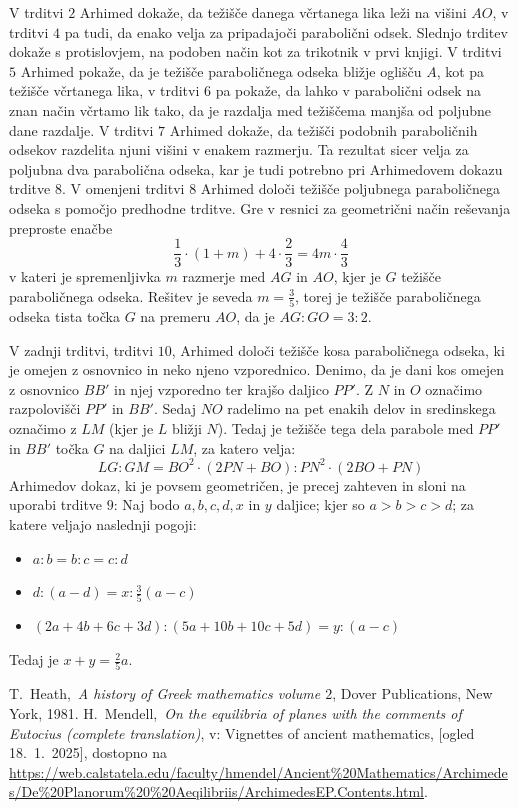 \documentclass[a4paper, 10pt]{article}
\begin{document}
		V trditvi $2$ Arhimed dokaže, da težišče danega včrtanega lika leži na višini $AO$, v trditvi $4$ pa tudi, da enako velja za pripadajoči parabolični odsek. Slednjo trditev dokaže s protislovjem, na podoben način kot za trikotnik v prvi knjigi. V trditvi $5$ Arhimed pokaže, da je težišče paraboličnega odseka bližje oglišču $A$, kot pa težišče včrtanega lika, v trditvi $6$ pa pokaže, da lahko v parabolični odsek na znan način včrtamo lik tako, da je razdalja med težiščema manjša od poljubne dane razdalje. V trditvi $7$ Arhimed dokaže, da težišči podobnih paraboličnih odsekov razdelita njuni višini v enakem razmerju. Ta rezultat sicer velja za poljubna dva parabolična odseka, kar je tudi potrebno pri Arhimedovem dokazu trditve $8$. V omenjeni trditvi $8$ Arhimed določi težišče poljubnega paraboličnega odseka s pomočjo predhodne trditve. Gre v resnici za geometrični način reševanja preproste enačbe $$\frac{1}{3}\cdot(1+m) + 4\cdot\frac{2}{3} = 4m\cdot\frac{4}{3}$$ v kateri je spremenljivka $m$ razmerje med $AG$ in $AO$, kjer je $G$ težišče paraboličnega odseka. Rešitev je seveda $m = \frac{3}{5}$, torej je težišče paraboličnega odseka tista točka $G$ na premeru $AO$, da je $AG:GO = 3:2$.
	
		V zadnji trditvi, trditvi $10$, Arhimed določi težišče kosa paraboličnega odseka, ki je omejen z osnovnico in neko njeno vzporednico. Denimo, da je dani kos omejen z osnovnico $BB'$ in njej vzporedno ter krajšo daljico $PP'$. Z $N$ in $O$ označimo razpolovišči $PP'$ in $BB'$. Sedaj $NO$ radelimo na pet enakih delov in sredinskega označimo z $LM$ (kjer je $L$ bližji $N$). Tedaj je težišče tega dela parabole med $PP'$ in $BB'$ točka $G$ na daljici $LM$, za katero velja:
		$$LG:GM = BO^2\cdot(2PN + BO):PN^2\cdot(2BO + PN)$$
		Arhimedov dokaz, ki je povsem geometričen, je precej zahteven in sloni na uporabi trditve $9$: Naj bodo $a, b, c, d, x$ in $y$ daljice; kjer so $a>b>c>d$; za katere veljajo naslednji pogoji: \begin{itemize}
		\item $a:b = b:c = c:d$
		\item $d:(a-d) = x: \frac{3}{5}(a-c)$
		\item $(2a+4b+6c+3d) : (5a+10b+10c+5d) = y: (a-c)$
		\end{itemize}
		Tedaj je $x + y = \frac{2}{5}a$.

	\begin{thebibliography}{99}
		
		 T.~Heath,~\emph{A history of Greek mathematics volume $2$}, Dover Publications, New York, 1981.
		 H.~Mendell,~\emph{On the equilibria of planes with the comments of Eutocius (complete translation)}, v: Vignettes of ancient mathematics, [ogled 18.~1.~2025], dostopno na \url{https://web.calstatela.edu/faculty/hmendel/Ancient%20Mathematics/Archimedes/De%20Planorum%20%20Aeqilibriis/ArchimedesEP.Contents.html}.
		
	\end{thebibliography}
\end{document}
